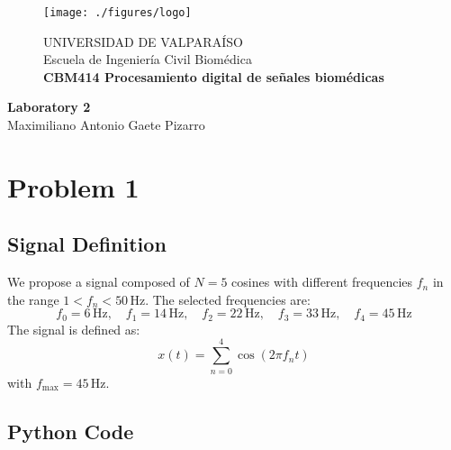 \documentclass[10pt]{article}
\theoremstyle{definition}
\theoremstyle{remark}
\theoremstyle{definition}
\numberwithin{equation}{prob}
\begin{document}
	
	\begin{titlepage}
		
		
		\begin{figure}
			\begin{minipage}{4cm}
				\texttt{[image: ./figures/logo]}
			\end{minipage}
			\begin{minipage}{11cm}
				\vspace{4mm}
				{\sc UNIVERSIDAD DE VALPARAÍSO}\\
				Escuela de Ingeniería Civil Biomédica\\
				{\bf CBM414 Procesamiento digital de señales biomédicas}\\
				\vspace{0mm}
				\hrulefill
			\end{minipage}
		\end{figure}
		\phantom{""}\vspace{60mm}
		
		
		\begin{center}
			\Huge{\textbf{Laboratory 2}}\vspace{95mm}\\
			\raggedleft \Large{Maximiliano Antonio Gaete Pizarro}\\ 
		\end{center}
		
		
	\end{titlepage}
	
\printindex


\section{Problem 1}

\subsection{Signal Definition}

We propose a signal composed of \( N = 5 \) cosines with different frequencies \( f_n \) in the range \( 1 < f_n < 50 \, \text{Hz} \). The selected frequencies are:
\[
f_0 = 6 \, \text{Hz}, \quad f_1 = 14 \, \text{Hz}, \quad f_2 = 22 \, \text{Hz}, \quad f_3 = 33 \, \text{Hz}, \quad f_4 = 45 \, \text{Hz}
\]
The signal is defined as:
\[
x(t) = \sum_{n=0}^{4} \cos(2 \pi f_n t)
\]
with \( f_{\text{max}} = 45 \, \text{Hz} \).

\subsection{Python Code}
\end{document}

